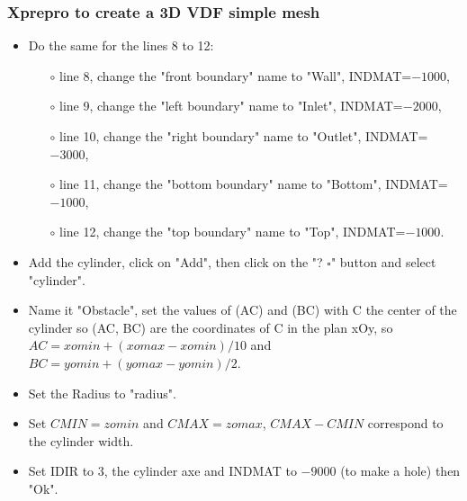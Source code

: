 \documentclass[10pt]{beamer}
\begin{document}
\begin{frame}
\frametitle{Xprepro to create a 3D VDF simple mesh}
\begin{block}{}

\begin{itemize}
\item Do the same for the lines 8 to 12:
    \begin{itemize}
    \item [$\circ$] line 8, change the "front boundary" name to "Wall", INDMAT=$-1000$,
    \item [$\circ$] line 9, change the "left boundary" name to "Inlet", INDMAT=$-2000$,
    \item [$\circ$] line 10, change the "right boundary" name to "Outlet", INDMAT=$-3000$,
    \item [$\circ$] line 11, change the "bottom boundary" name to "Bottom", INDMAT=$-1000$,
    \item [$\circ$] line 12, change the "top boundary" name to "Top", INDMAT=$-1000$.
    \end{itemize}
\item Add the cylinder, click on "Add", then click on the "? $\square$" button and select "cylinder".
\item Name it "Obstacle", set the values of (AC) and (BC) with C the center of the cylinder so (AC, BC) are the coordinates of C in the plan xOy, so $AC=xomin+(xomax-xomin)/10$ and $BC=yomin+(yomax-yomin)/2$.
\item Set the Radius to "radius".
\item Set $CMIN=zomin$ and $CMAX=zomax$, $CMAX-CMIN$ correspond to the cylinder width.
\item Set IDIR to $3$, the cylinder axe and INDMAT to $-9000$ (to make a hole) then "Ok".

\end{itemize}

\end{block}
\end{frame}
\end{document}
